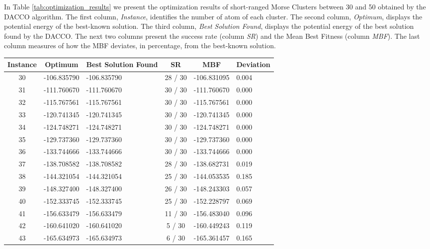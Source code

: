 	In Table \ref{tab:optimization_results} we present the optimization results of short-ranged Morse Clusters between 30 and 50 obtained by the DACCO algorithm. The first column, \emph{Instance}, identifies the number of atom of each cluster. The second column, \emph{Optimum}, displays the potential energy of the best-known solution. The third column, \emph{Best Solution Found}, displays the potential energy of the best solution found by the DACCO. The next two columns present the success rate (column \emph{SR}) and the Mean Best Fitness (column \emph{MBF}). The last column measures of how the MBF deviates, in percentage, from the best-known solution.
	\begin{table}[!htbp]
		\begin{center}
			\begin{tabular}{| c | c | p{3cm} | c | c | p{2cm} |}
				\hline
				\textbf{Instance} & \textbf{Optimum} & \textbf{Best Solution Found} & \textbf{SR} & \textbf{MBF} & \textbf{Deviation}\\ \hline
				30 & -106.835790 & -106.835790 & 28 / 30 & -106.831095 & 0.004 \\ \hline
				31 & -111.760670 & -111.760670 & 30 / 30 & -111.760670 & 0.000 \\ \hline
				32 & -115.767561 & -115.767561 & 30 / 30 & -115.767561 & 0.000 \\ \hline
				33 & -120.741345 & -120.741345 & 30 / 30 & -120.741345 & 0.000 \\ \hline
				34 & -124.748271 & -124.748271 & 30 / 30 & -124.748271 & 0.000 \\ \hline
				35 & -129.737360 & -129.737360 & 30 / 30 & -129.737360 & 0.000 \\ \hline
				36 & -133.744666 & -133.744666 & 30 / 30 & -133.744666 & 0.000 \\ \hline
				37 & -138.708582 & -138.708582 & 28 / 30 & -138.682731 & 0.019 \\ \hline
				38 & -144.321054 & -144.321054 & 25 / 30 & -144.053535 & 0.185 \\ \hline
				39 & -148.327400 & -148.327400 & 26 / 30 & -148.243303 & 0.057 \\ \hline
				40 & -152.333745 & -152.333745 & 25 / 30 & -152.228797 & 0.069 \\ \hline
				41 & -156.633479 & -156.633479 & 11 / 30 & -156.483040 & 0.096 \\ \hline
				42 & -160.641020 & -160.641020 & 5 / 30 & -160.449243 & 0.119 \\ \hline
				43 & -165.634973 & -165.634973 & 6 / 30 & -165.361457 & 0.165 \\ \hline

\end{tabular}
\end{center}
\end{table}

